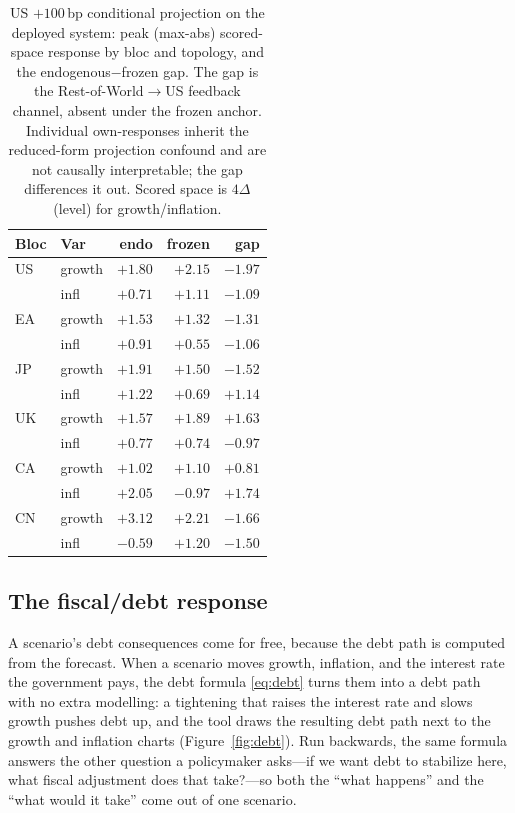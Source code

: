 \documentclass[11pt]{article}
\begin{document}
\begin{table}[t]
\centering
\caption{US $+100$\,bp conditional projection on the deployed system: peak (max-abs) scored-space response
by bloc and topology, and the endogenous$-$frozen gap. The gap is the Rest-of-World$\to$US feedback
channel, absent under the frozen anchor. Individual own-responses inherit the reduced-form
projection confound and are not causally interpretable; the gap differences it out. Scored space is
$4\Delta$(level) for growth/inflation.}
\label{tab:spillover}
\begin{tabular}{@{}llrrr@{}}
\toprule
Bloc & Var & endo & frozen & gap \\
\midrule
US & growth & $+1.80$ & $+2.15$ & $-1.97$ \\
   & infl   & $+0.71$ & $+1.11$ & $-1.09$ \\
EA & growth & $+1.53$ & $+1.32$ & $-1.31$ \\
   & infl   & $+0.91$ & $+0.55$ & $-1.06$ \\
JP & growth & $+1.91$ & $+1.50$ & $-1.52$ \\
   & infl   & $+1.22$ & $+0.69$ & $+1.14$ \\
UK & growth & $+1.57$ & $+1.89$ & $+1.63$ \\
   & infl   & $+0.77$ & $+0.74$ & $-0.97$ \\
CA & growth & $+1.02$ & $+1.10$ & $+0.81$ \\
   & infl   & $+2.05$ & $-0.97$ & $+1.74$ \\
CN & growth & $+3.12$ & $+2.21$ & $-1.66$ \\
   & infl   & $-0.59$ & $+1.20$ & $-1.50$ \\
\bottomrule
\end{tabular}
\end{table}

\subsection{The fiscal/debt response}
\label{sub:scenario-fiscal}

A scenario's debt consequences come for free, because the debt path is computed from the forecast. When a
scenario moves growth, inflation, and the interest rate the government pays, the debt formula
\eqref{eq:debt} turns them into a debt path with no extra modelling: a tightening that raises the interest
rate and slows growth pushes debt up, and the tool draws the resulting debt path next to the growth and
inflation charts (Figure~\ref{fig:debt}). Run backwards, the same formula answers the other question a
policymaker asks---if we want debt to stabilize here, what fiscal adjustment does that take?---so both the
``what happens'' and the ``what would it take'' come out of one scenario.
\end{document}
